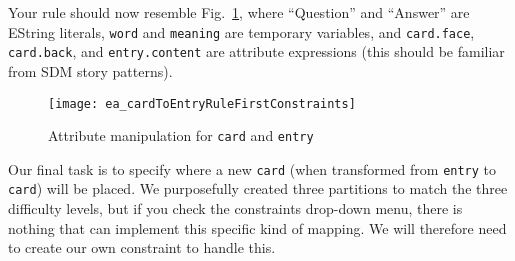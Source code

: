 \vspace{0.5cm}

Your rule should now resemble Fig.~\ref{ea:cardtoentry_2}, where ``Question'' and ``Answer'' are EString literals, \texttt{word} and \texttt{meaning} are
temporary variables, and \texttt{card.face}, \texttt{card.back}, and \texttt{entry.content} are attribute expressions (this should be familiar from SDM story
patterns).

\vspace{0.5cm}

\begin{figure}[htbp]
\begin{center}
  \texttt{[image: ea\_cardToEntryRuleFirstConstraints]}
  \caption{Attribute manipulation for \texttt{card} and \texttt{entry}}
  \label{ea:cardtoentry_2}
\end{center}
\end{figure}
\FloatBarrier

Our final task is to specify where a new \texttt{card} (when transformed from \texttt{entry} to \texttt{card}) will be placed.  We purposefully created three
partitions to match the three difficulty levels, but if you check the constraints drop-down menu, there is nothing that can implement this specific kind of
mapping. We will therefore need to create our own constraint to handle this.

